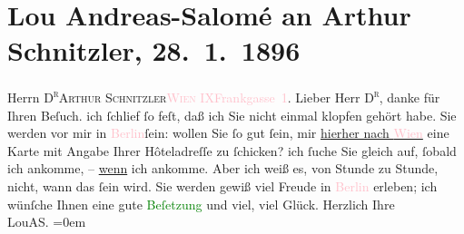 

               \section[Lou Andreas-Salomé an Arthur Schnitzler, 28. 1. 1896]{ Lou Andreas-Salomé an Arthur Schnitzler, 28. 1. 1896}\nopagebreak{}\rehead{ }\normalsize\beginnumbering{} \toendnotes[C]{\smallbreak\pagebreak[2]} 
\toendnotes[C]{\smallbreak}\pstart{}{\pb}Herrn \textsc{D\textsuperscript{r}}\pend{}\pstart{}\textsc{Arthur Schnitzler}\pend{}\pstart{}\textsc{\textcolor{pink}{Wien IX}{}\ledrightnote{\textcolor{pink}{IX., Alsergrund}}}\pend{}\pstart{}\textcolor{pink}{Frankgasse 1}{}\ledrightnote{\textcolor{pink}{Frankgasse}}.
                    \pend{}{\bigskip}\pstart
           \noindent{}{\pb}Lieber Herr \textsc{D\textsuperscript{r}}, danke für Ihren Beſuch. ich ſchlief ſo feſt, daß ich Sie
                    nicht einmal klopfen gehört habe. Sie werden vor mir in \textcolor{pink}{Berlin}{}\ledrightnote{\textcolor{pink}{Berlin}}{ }ſein: wollen Sie ſo gut ſein, mir \uline{hierher nach \textcolor{pink}{Wien}{}\ledrightnote{\textcolor{pink}{Wien}}} eine Karte mit Angabe Ihrer Hôteladreſſe zu ſchicken? ich ſuche Sie gleich
                    auf, ſobald ich ankomme, – \uline{wenn} ich ankomme.
                    Aber ich weiß es, von Stunde zu Stunde, nicht, wann das ſein wird.\pend
           \pstart
           Sie werden gewiß viel Freude in \textcolor{pink}{Berlin}{}\ledrightnote{\textcolor{pink}{Berlin}}
                    erleben; ich wünſche Ihnen eine gute \textcolor{green}{Beſetzung}{} und viel, viel Glück.\pend
           \pstart
           Herzlich Ihre{\\[\baselineskip]}\spacefill\mbox{LouAS.}\pend
           \leftskip=0em{}\endnumbering{}  
      